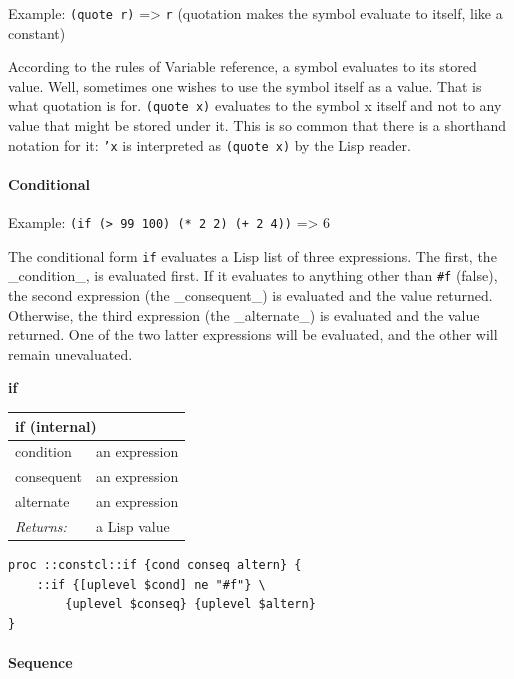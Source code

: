 \documentclass[twoside,9pt]{report}
\begin{document}
Example: \texttt{(quote r)} => \texttt{r} (quotation makes the symbol evaluate to itself, like a constant)


According to the rules of Variable reference, a symbol evaluates to its stored value. Well, sometimes one wishes to use the symbol itself as a value. That is what quotation is for. \texttt{(quote x)} evaluates to the symbol x itself and not to any value that might be stored under it. This is so common that there is a shorthand notation for it: \texttt{'x} is interpreted as \texttt{(quote x)} by the Lisp reader.

\paragraph{Conditional}
\label{conditional}

Example: \texttt{(if (> 99 100) (* 2 2) (+ 2 4))} => 6


The conditional form \texttt{if} evaluates a Lisp list of three expressions. The first, the \_condition\_, is evaluated first. If it evaluates to anything other than \texttt{\#f} (false), the second expression (the \_consequent\_) is evaluated and the value returned. Otherwise, the third expression (the \_alternate\_) is evaluated and the value returned. One of the two latter expressions will be evaluated, and the other will remain unevaluated.


\textbf{if}

\begin{tabular}{ |l l| }
\hline
\multicolumn{2}{|l|}{if (internal)} \\
\hline
condition & an expression \\
consequent & an expression \\
alternate & an expression \\
\textit{Returns:} & a Lisp value \\
\hline
\end{tabular}

\noindent\makebox[\linewidth]{\rule{\linewidth}{0.4pt}}
\begin{lstlisting}
proc ::constcl::if {cond conseq altern} {
    ::if {[uplevel $cond] ne "#f"} \
        {uplevel $conseq} {uplevel $altern}
}
\end{lstlisting}
\noindent\makebox[\linewidth]{\rule{\linewidth}{0.4pt}}
\paragraph{Sequence}
\label{sequence}
\end{document}
